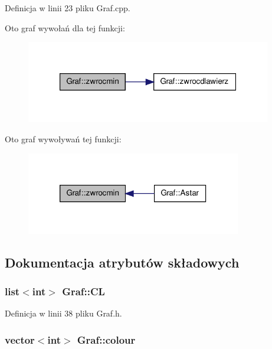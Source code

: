 Definicja w linii 23 pliku Graf.\-cpp.



Oto graf wywołań dla tej funkcji\-:\nopagebreak
\begin{figure}[H]
\begin{center}
\leavevmode
\includegraphics[width=304pt]{class_graf_ac00087eee459e249a5eb875cb9174db0_cgraph}
\end{center}
\end{figure}




Oto graf wywoływań tej funkcji\-:\nopagebreak
\begin{figure}[H]
\begin{center}
\leavevmode
\includegraphics[width=266pt]{class_graf_ac00087eee459e249a5eb875cb9174db0_icgraph}
\end{center}
\end{figure}




\subsection{Dokumentacja atrybutów składowych}
\hypertarget{class_graf_a1b3d532db5934e6f161b914794c444d5}{
\subsubsection[{C\-L}]{\setlength{\rightskip}{0pt plus 5cm}list$<$int$>$ Graf\-::\-C\-L}}\label{class_graf_a1b3d532db5934e6f161b914794c444d5}


Definicja w linii 38 pliku Graf.\-h.

\hypertarget{class_graf_a8cc46484cf7f96ce274d87829bf10120}{
\subsubsection[{colour}]{\setlength{\rightskip}{0pt plus 5cm}vector$<$int$>$ Graf\-::colour}}\label{class_graf_a8cc46484cf7f96ce274d87829bf10120}


